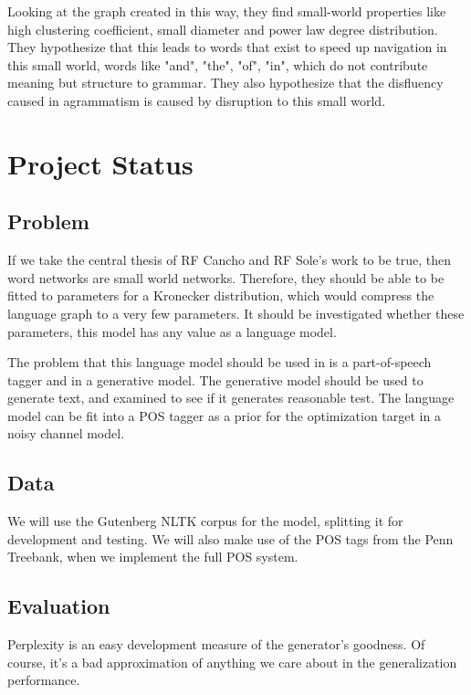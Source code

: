 \documentclass[12pt]{article}
\begin{document}
Looking at the graph created in this way, they find small-world properties like high clustering coefficient, small diameter and power law degree distribution. They hypothesize that this leads to words that exist to speed up navigation in this small world, words like "and", "the", "of", "in", which do not contribute meaning but structure to grammar. They also hypothesize that the disfluency caused in agrammatism is caused by disruption to this small world.

\section{Project Status}

\subsection{Problem}

If we take the central thesis of RF Cancho and RF Sole's work to be true, then word networks are small world networks. Therefore, they should be able to be fitted to parameters for a Kronecker distribution, which would compress the language graph to a very few parameters. It should be investigated whether these parameters, this model has any value as a language model.

The problem that this language model should be used in is a part-of-speech tagger and in a generative model. The generative model should be used to generate text, and examined to see if it generates reasonable test. The language model can be fit into a POS tagger as a prior for the optimization target in a noisy channel model.%

\subsection{Data}
We will use the Gutenberg NLTK corpus for the model, splitting it for development and testing. We will also make use of the POS tags from the Penn Treebank, when we implement the full POS system. %

\subsection{Evaluation}
Perplexity is an easy development measure of the generator's goodness. Of course, it's a bad approximation of anything we care about in the generalization performance. %
\end{document}
